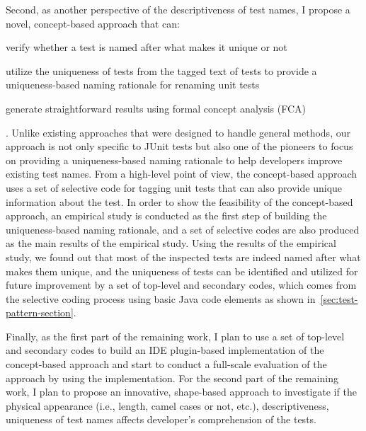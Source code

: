 Second, as another perspective of the descriptiveness of test names, I propose a novel, concept-based approach that can:
%
\begin{enumerate*}
\item verify whether a test is named after what makes it unique or not
\item utilize the uniqueness of tests from the tagged text of tests to provide a uniqueness-based naming rationale for renaming unit tests
\item generate straightforward results using formal concept analysis (FCA)~\cite{ganter2012formal}
\end{enumerate*}.
%
Unlike existing approaches that were designed to handle general methods, our approach is not only specific to JUnit tests but also one of the pioneers to focus on providing a uniqueness-based naming rationale to help developers improve existing test names.
%
From a high-level point of view, the concept-based approach uses a set of selective code for tagging unit tests that can also provide unique information about the test.
%
In order to show the feasibility of the concept-based approach, an empirical study is conducted as the first step of building the uniqueness-based naming rationale, and a set of selective codes are also produced as the main results of the empirical study.
%
Using the results of the empirical study, we found out that most of the inspected tests are indeed named after what makes them unique, and the uniqueness of tests can be identified and utilized for future improvement by a set of top-level and secondary codes, which comes from the selective coding process using basic Java code elements as shown in~\cref{sec:test-pattern-section}.


Finally, as the first part of the remaining work, I plan to use a set of top-level and secondary codes to build an IDE plugin-based implementation of the concept-based approach and start to conduct a full-scale evaluation of the approach by using the implementation.
%
For the second part of the remaining work, I plan to propose an innovative, shape-based approach to investigate if the physical appearance (i.e., length, camel cases or not, etc.), descriptiveness, uniqueness of test names affects developer's comprehension of the tests.